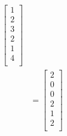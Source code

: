 \documentclass[letterpaper, 11pt]{article}
\begin{document}
\begin{align*}
    \begin{bmatrix}
        1 \\
        2 \\
        3 \\
        2 \\
        1 \\
        4 \\
    \end{bmatrix} \\
     & =
    \begin{bmatrix}
        2 \\
        0 \\
        0 \\
        2 \\
        1 \\
        2 \\
    \end{bmatrix} \\
\end{align*}
\end{document}
